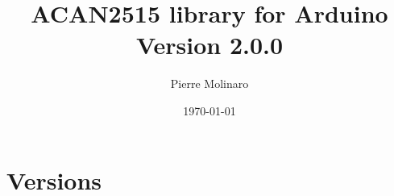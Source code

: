 \documentclass[10pt, a4paper, obeyspaces]{extarticle}
\begin{document}
 


\title{\bf \Huge{ACAN2515 library for Arduino\\Version 2.0.0}}
\author{Pierre Molinaro}
\date {\today}

\maketitle


\tableofcontents


\newpage
\section{Versions}
\end{document}
